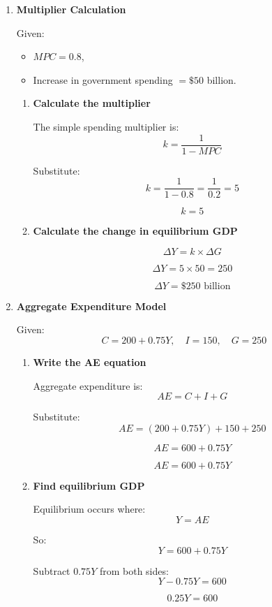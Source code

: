 \documentclass[12pt]{article}
\begin{document}
\begin{enumerate}[label=\textbf{\arabic*.}, start=9]

\item \textbf{Multiplier Calculation}

Given:
\begin{itemize}
    \item \(MPC = 0.8\),
    \item Increase in government spending \(= \$50\) billion.
\end{itemize}

\begin{enumerate}
    \item[(a)] \textbf{Calculate the multiplier}

The simple spending multiplier is:
\[
k = \frac{1}{1-MPC}
\]

Substitute:
\[
k = \frac{1}{1-0.8} = \frac{1}{0.2} = 5
\]

\[
\boxed{k=5}
\]

\item[(b)] \textbf{Calculate the change in equilibrium GDP}

\[
\Delta Y = k \times \Delta G
\]

\[
\Delta Y = 5 \times 50 = 250
\]

\[
\boxed{\Delta Y = \$250 \text{ billion}}
\]
\end{enumerate}

\item \textbf{Aggregate Expenditure Model}

Given:
\[
C = 200 + 0.75Y, \quad I = 150, \quad G = 250
\]

\begin{enumerate}
    \item[(a)] \textbf{Write the AE equation}

Aggregate expenditure is:
\[
AE = C + I + G
\]

Substitute:
\[
AE = (200 + 0.75Y) + 150 + 250
\]

\[
AE = 600 + 0.75Y
\]

\[
\boxed{AE = 600 + 0.75Y}
\]

\item[(b)] \textbf{Find equilibrium GDP}

Equilibrium occurs where:
\[
Y = AE
\]

So:
\[
Y = 600 + 0.75Y
\]

Subtract \(0.75Y\) from both sides:
\[
Y - 0.75Y = 600
\]

\[
0.25Y = 600
\]


\end{enumerate}
\end{enumerate}
\end{document}
